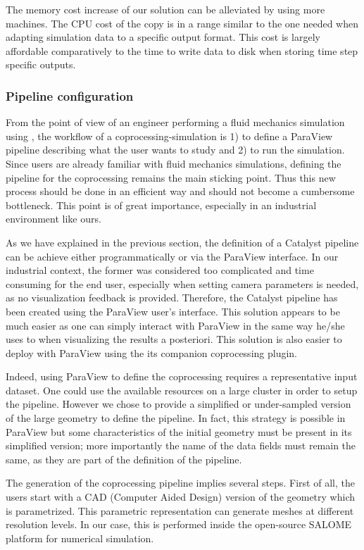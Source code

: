 The memory cost increase of our solution can be alleviated by using more
machines. The CPU cost of the copy is in a range similar to the one needed when
adapting simulation data to a specific output format. This cost is largely
affordable comparatively to the time to write data to disk when storing time
step specific outputs. 

\subsubsection{Pipeline configuration}
\label{sec:pip_conf_tools}

From the point of view of an engineer performing a fluid mechanics simulation
using \CS, the workflow of a coprocessing-simulation is 1) to define
a ParaView pipeline describing what the user wants to study and 2) to run the
simulation. Since users are already familiar with fluid mechanics
simulations, defining the pipeline for the coprocessing remains the main
sticking point. Thus this new process should be done in an efficient way and 
should not become a cumbersome bottleneck. This point is of great importance, especially in
an industrial environment like ours.

As we have explained in the previous section, the definition of a Catalyst pipeline can be achieve either 
programmatically or via the ParaView interface. In our industrial context, the former 
was considered too complicated and time consuming for the end user, especially when setting camera
parameters is needed, as no visualization feedback is provided. Therefore, the Catalyst pipeline has 
been created using the ParaView user's interface. This solution appears to be much easier as one
can simply interact with ParaView in the same way he/she uses to when
visualizing the results a posteriori. This solution is also easier to deploy with ParaView using the 
its companion coprocessing plugin. 

Indeed, using ParaView to define the coprocessing requires a representative input dataset.
One could use the available resources on a large cluster in order to setup the pipeline. However we chose to  
provide a simplified or under-sampled version of the large geometry to define the
pipeline. In fact, this strategy is possible in ParaView but some
characteristics of the initial geometry must be present in its simplified version; more importantly the name of the data fields must
remain the same, as they are part of the definition of the pipeline.

The generation of the coprocessing pipeline implies several steps.
First of all, the users start with a CAD (Computer Aided Design)
version of the geometry which is parametrized. This parametric representation
can generate meshes at different resolution levels. In our case, this is
performed inside the open-source SALOME~\cite{4291178} platform for numerical simulation. 

